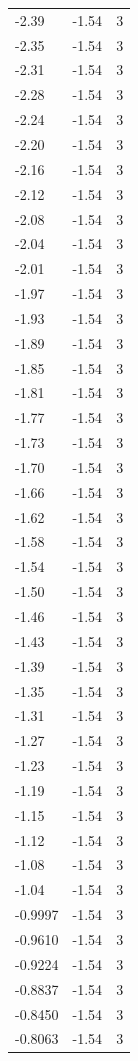 \begin{longtable}{lrr}
  -2.39 & -1.54 & 3 \\
  -2.35 & -1.54 & 3 \\
  -2.31 & -1.54 & 3 \\
  -2.28 & -1.54 & 3 \\
  -2.24 & -1.54 & 3 \\
  -2.20 & -1.54 & 3 \\
  -2.16 & -1.54 & 3 \\
  -2.12 & -1.54 & 3 \\
  -2.08 & -1.54 & 3 \\
  -2.04 & -1.54 & 3 \\
  -2.01 & -1.54 & 3 \\
  -1.97 & -1.54 & 3 \\
  -1.93 & -1.54 & 3 \\
  -1.89 & -1.54 & 3 \\
  -1.85 & -1.54 & 3 \\
  -1.81 & -1.54 & 3 \\
  -1.77 & -1.54 & 3 \\
  -1.73 & -1.54 & 3 \\
  -1.70 & -1.54 & 3 \\
  -1.66 & -1.54 & 3 \\
  -1.62 & -1.54 & 3 \\
  -1.58 & -1.54 & 3 \\
  -1.54 & -1.54 & 3 \\
  -1.50 & -1.54 & 3 \\
  -1.46 & -1.54 & 3 \\
  -1.43 & -1.54 & 3 \\
  -1.39 & -1.54 & 3 \\
  -1.35 & -1.54 & 3 \\
  -1.31 & -1.54 & 3 \\
  -1.27 & -1.54 & 3 \\
  -1.23 & -1.54 & 3 \\
  -1.19 & -1.54 & 3 \\
  -1.15 & -1.54 & 3 \\
  -1.12 & -1.54 & 3 \\
  -1.08 & -1.54 & 3 \\
  -1.04 & -1.54 & 3 \\
  -0.9997 & -1.54 & 3 \\
  -0.9610 & -1.54 & 3 \\
  -0.9224 & -1.54 & 3 \\
  -0.8837 & -1.54 & 3 \\
  -0.8450 & -1.54 & 3 \\
  -0.8063 & -1.54 & 3 \\

\end{longtable}
